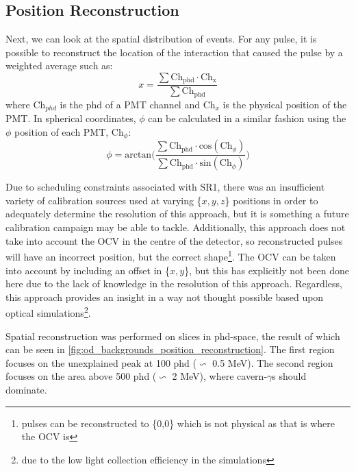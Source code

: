 



\subsection{Position Reconstruction}
\par
Next, we can look at the spatial distribution of events.
For any pulse, it is possible to reconstruct the location of the interaction that caused the pulse by a weighted average such as:
\begin{equation}
    x = \frac{\sum{\text{Ch}_{\text{phd}} \cdot \text{Ch}_\text{x}}}{\sum{\text{Ch}_\text{phd}}} 
\label{eq:OD_xy_position}
\end{equation}
where Ch$_{phd}$ is the phd of a PMT channel and Ch$_{x}$ is the physical position of the PMT.
In spherical coordinates, $\phi$ can be calculated in a similar fashion using the $\phi$ position of each PMT, Ch$_\phi$:
\begin{equation}
    \phi = \text{arctan}\bigg( \frac{\sum{\text{Ch}_\text{phd} \cdot \text{cos}(\text{Ch}_{\phi})}}{\sum{\text{Ch}_\text{phd} \cdot \text{sin}(\text{Ch}_{\phi})}} \bigg)
\label{eq:OD_phi_position}
\end{equation}
\par
Due to scheduling constraints associated with SR1, there was an insufficient variety of calibration sources used at varying \{$x,y,z$\} positions in order to adequately determine the resolution of this approach, but it is something a future calibration campaign may be able to tackle. 
Additionally, this approach does not take into account the OCV in the centre of the detector, so reconstructed pulses will have an incorrect position, but the correct shape\footnote{pulses can be reconstructed to \{0,0\} which is not physical as that is where the OCV is}.
The OCV can be taken into account by including an offset in \{$x,y$\}, but this has explicitly not been done here due to the lack of knowledge in the resolution of this approach.
Regardless, this approach provides an insight in a way not thought possible based upon optical simulations\footnote{due to the low light collection efficiency in the simulations}.

\par
Spatial reconstruction was performed on slices in phd-space, the result of which can be seen in \autoref{fig:od_backgrounds_position_reconstruction}.
The first region focuses on the unexplained peak at 100 phd ($\backsim$ 0.5 MeV).
The second region focuses on the area above 500 phd ($\backsim$ 2 MeV), where cavern-$\gamma$s should dominate.

